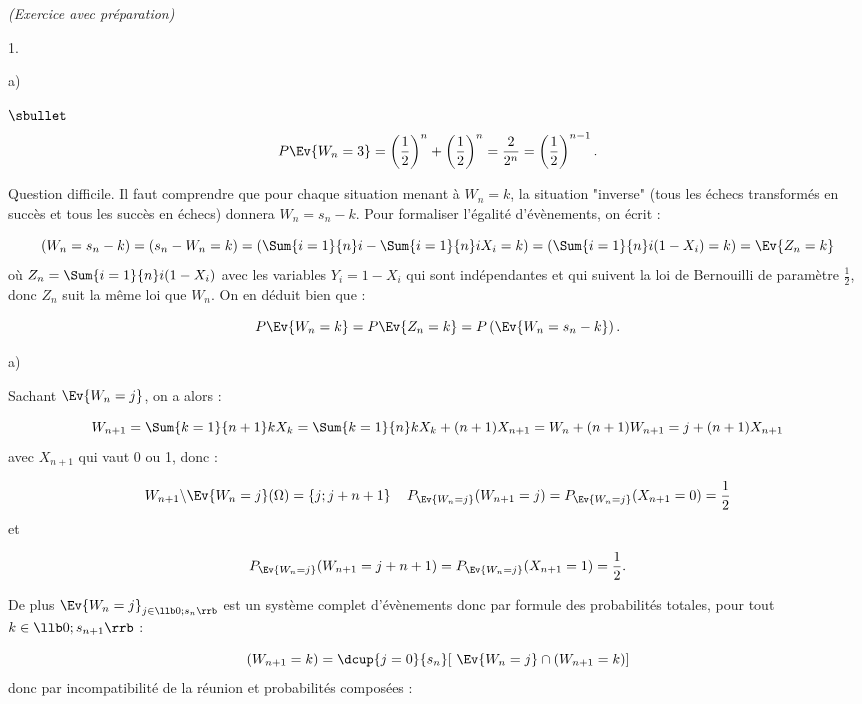 \documentclass[11pt]{article}%
\begin{document}
\begin{exercice}{\it (Exercice avec préparation)}
\begin{noliste}{1.}
\begin{noliste}{a)}
\begin{noliste}{$\sbullet$}
\[
 P \Ev{ W_{n} = 3 } = \left( \frac{ 1 }{ 2 } \right)^{n} + \left(
 \frac{ 1 }{ 2 } \right)^{n} = \frac{ 2 }{ 2^{n} } = \left(
 \frac{ 1 }{ 2 } \right)^{ n-1 }.
\]
 \end{noliste}
 \end{noliste}
 
 \item Question difficile. Il faut comprendre que pour chaque
 situation menant à $W_{n} = k$, la situation "inverse" (tous les
 échecs transformés en succès et tous les succès en échecs) donnera
 $W_{n} = s_{n} - k$. Pour formaliser l'égalité d'évènements, on écrit
:
 
\[
 (W_{n} = s_{n} - k ) = ( s_{n} - W_{n} = k ) = \left( \Sum{i = 1}{n} i
-
 \Sum{i = 1}{n} i X_{i} = k \right) = \left( \Sum{i = 1}{n} i (1-X_{i})
 = k \right) = \Ev{ Z_{n} = k }
\]
 où $Z_{n} = \Sum{i = 1}{n} i (1 - X_{i} )$ avec les variables $Y_{i} =
1
 - X_{i}$ qui sont indépendantes et qui suivent la loi de Bernouilli
 de paramètre $\frac{1}{2}$, donc $Z_{n}$ suit la même loi que
 $W_{n}$. On en déduit bien que :
 
\[
 P \Ev{ W_{n} = k } = P \Ev{ Z_{n} = k } = P \left(\Ev{ W_{n} = s_{n} -
k }\right).
\]
 
 \item
 \begin{noliste}{a)}
 \setlength{\itemsep}{2mm}
 \item Sachant $\Ev{W_{n} = j}$, on a alors :
 
\[
 W_{n + 1} = \Sum{k = 1}{n + 1} k X_{k} = \Sum{k = 1}{n} k X_{k} + (n +
1)
 X_{n + 1} = W_{n} + (n + 1) W_{n + 1} = j + (n + 1) X_{n + 1}
\]
 avec $X_{n + 1}$ qui vaut 0 ou 1, donc :
 
\[
 W_{n + 1} \backslash \Ev{W_{n} = j } ( \Omega ) = \{ j ; j + n + 1
 \} \ \, \ \ P_{ \Ev{W_{n} = j } } ( W_{n + 1} = j ) = P_{ \Ev{W_{n}
 = j } } ( X_{n + 1} = 0 ) = \frac{ 1 }{ 2 }
\]
 et
 
\[
 P_{ \Ev{W_{n} = j } } ( W_{n + 1} = j + n + 1 ) = P_{ \Ev{W_{n} = j }
 } ( X_{n + 1} = 1 ) = \frac{ 1 }{ 2 }.
\]
 
 \item De plus $\Ev{W_{n} = j}_{ j \in \llb 0 ; s_{n} \rrb }$ est un
 système complet d'évènements donc par formule des probabilités
 totales, pour tout $k \in \llb 0 ; s_{n + 1} \rrb$ :
 
\[
 ( W_{n + 1} = k ) = \dcup{j = 0}{ s_{n} } [ \ \Ev{W_{n} = j }
 \cap (W_{n + 1} = k ) ]
\]
 donc par incompatibilité de la réunion et probabilités
 composées :
 

\end{noliste}
\end{noliste}
\end{exercice}
\end{document}
